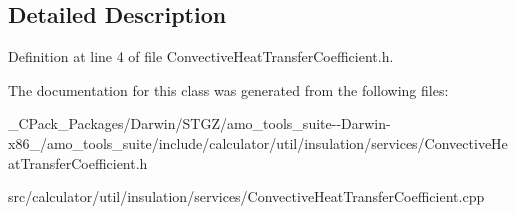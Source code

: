 \subsection{Detailed Description}


Definition at line 4 of file Convective\+Heat\+Transfer\+Coefficient.\+h.



The documentation for this class was generated from the following files\+:\begin{DoxyCompactItemize}
\item 
\+\_\+\+C\+Pack\+\_\+\+Packages/\+Darwin/\+S\+T\+G\+Z/amo\+\_\+tools\+\_\+suite-\/-\/\+Darwin-\/x86\+\_/amo\+\_\+tools\+\_\+suite/include/calculator/util/insulation/services/Convective\+Heat\+Transfer\+Coefficient.\+h\item 
src/calculator/util/insulation/services/Convective\+Heat\+Transfer\+Coefficient.\+cpp\end{DoxyCompactItemize}
